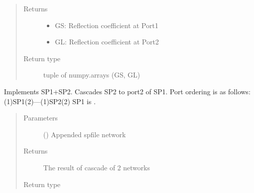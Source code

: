 \documentclass[letterpaper,10pt,english]{sphinxmanual}
\begin{document}
\begin{fulllineitems}
\begin{fulllineitems}
\begin{quote}
\begin{description}
\item[{Returns}] \leavevmode
\begin{itemize}
\item {} 
GS: Reflection coefficient at Port\sphinxhyphen{}1

\item {} 
GL: Reflection coefficient at Port\sphinxhyphen{}2

\end{itemize}


\item[{Return type}] \sphinxhyphen{}tuple of numpy.arrays (GS, GL)

\end{description}\end{quote}

\end{fulllineitems}


\begin{fulllineitems}
\label{\detokenize{touchstone:touchstone.spfile.__add__}}
Implements SP1+SP2.
Cascades SP2 to port\sphinxhyphen{}2 of SP1.
Port ordering is as follows:
(1)\sphinxhyphen{}SP1\sphinxhyphen{}(2)—(1)\sphinxhyphen{}SP2\sphinxhyphen{}(2)
SP1 is .
\begin{quote}\begin{description}
\item[{Parameters}] \leavevmode
{} ({\hyperref[\detokenize{touchstone:touchstone.spfile}]{}}) \textendash{} Appended spfile network

\item[{Returns}] \leavevmode
The result of cascade of 2 networks

\item[{Return type}] \leavevmode
{\hyperref[\detokenize{touchstone:touchstone.spfile}]{}}

\end{description}\end{quote}

\end{fulllineitems}



\end{fulllineitems}
\end{document}
